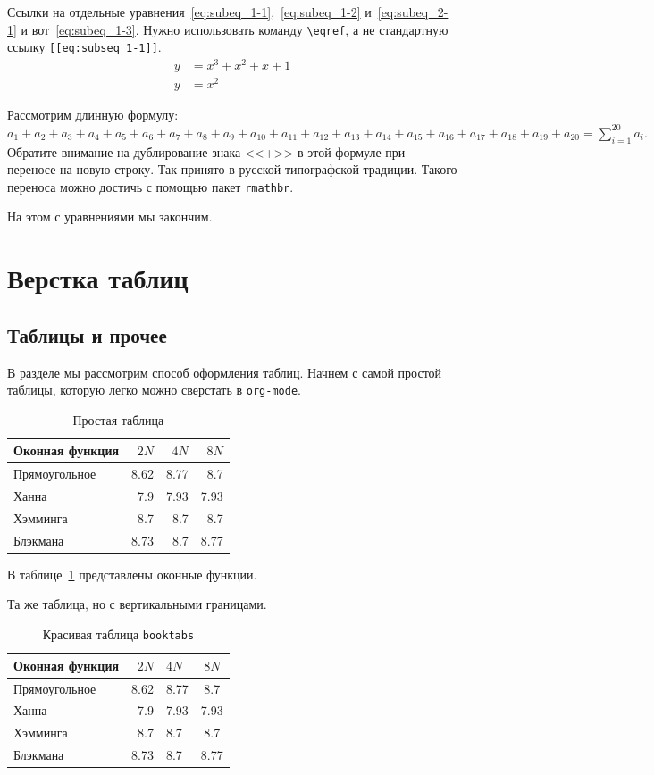 \documentclass[14pt]{cmcmsuthesis-bachelor}
\begin{document}
Ссылки на отдельные уравнения~\eqref{eq:subeq_1-1},~\eqref{eq:subeq_1-2} и~\eqref{eq:subeq_2-1} и вот~\eqref{eq:subeq_1-3}.
Нужно использовать команду \texttt{\textbackslash{}eqref}, а не стандартную ссылку \texttt{[[eq:subseq\_1-1]]}.
\begin{subequations}
\label{eq:subeq_2}
\begin{align}
        y & = x^3 + x^2 + x + 1\label{eq:subeq_2-1} \\
        y & = x^2
    \end{align}
\end{subequations}

Рассмотрим длинную формулу:
\(a_1+a_2+a_3+a_4+a_5+a_6+a_7+a_8+a_{9}+a_{10}+a_{11}+a_{12}+a_{13}+a_{14}+a_{15}+a_{16}+a_{17}+a_{18}+a_{19}+a_{20}=\sum_{i=1}^{20}a_{i}.\)
Обратите внимание на дублирование знака {}<<+>>{} в этой формуле при переносе на новую строку.
Так принято в русской типографской традиции.
Такого переноса можно достичь с помощью пакет \texttt{rmathbr}.

На этом с уравнениями мы закончим.
\section{Верстка таблиц}
\label{sec:orgc7f6f59}
\subsection{Таблицы и прочее}
\label{sec:org16ef6e1}
В разделе мы рассмотрим способ оформления таблиц.
Начнем с самой простой таблицы, которую легко можно сверстать в \texttt{org-mode}.
\begin{table}[htbp]
\caption{\label{tab:table1}Простая таблица}
\centering
\begin{tabular}{lrrr}
\hline
Оконная функция & \(2N\) & \(4N\) & \(8N\)\\
\hline
Прямоугольное & 8.62 & 8.77 & 8.7\\
\hline
Ханна & 7.9 & 7.93 & 7.93\\
\hline
Хэмминга & 8.7 & 8.7 & 8.7\\
\hline
Блэкмана & 8.73 & 8.7 & 8.77\\
\hline
\end{tabular}
\end{table}

В таблице~\ref{tab:table1} представлены оконные функции.

Та же таблица, но с вертикальными границами.

\begin{table}[htbp]
\caption{\label{tab:table2}Красивая таблица \texttt{booktabs}}
\centering
\begin{tabular}{|l|r|l|c|}
\toprule
\textbf{Оконная функция} & \textbf{\(2N\)} & \textbf{\(4N\)} & \textbf{\(8N\)}\\
\midrule
Прямоугольное & 8.62 & 8.77 & 8.7\\
Ханна & 7.9 & 7.93 & 7.93\\
Хэмминга & 8.7 & 8.7 & 8.7\\
Блэкмана & 8.73 & 8.7 & 8.77\\
\bottomrule
\end{tabular}
\end{table}
\end{document}
